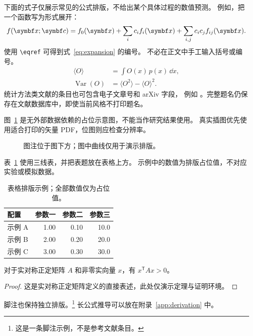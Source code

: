\label{chap:methods}
下面的式子仅展示常见的公式排版，不给出某个具体过程的数值预测。
例如，把一个函数写为形式展开：
\begin{equation}
 f(\vect{x};\vect{c})=f_0(\vect{x})+
 \sum_i c_i f_i(\vect{x})+
 \sum_{i,j}c_i c_j f_{ij}(\vect{x}).
 \label{eq:expansion}
\end{equation}
使用 \verb|\eqref| 可得到式~\eqref{eq:expansion} 的编号。
不必在正文中手工输入括号或编号。
\begin{align}
 \langle O\rangle &= \int O(x)\,p(x)\,\dd x,\\
 \operatorname{Var}(O) &= \langle O^2\rangle-\langle O\rangle^2.
\end{align}
统计方法类文献的条目也可包含电子文章号和 arXiv 字段，
例如 \cite{Cowan2011}。完整题名仍保存在文献数据库中，即使当前风格不打印题名。

图~\ref{fig:placeholder} 是无外部数据依赖的占位示意图，不能当作研究结果使用。
真实插图优先使用适合打印的矢量 PDF，位图则应检查分辨率。
\begin{figure}[htbp]
 \centering
 \caption{图注位于图下方；图中曲线仅用于演示排版。}
 \label{fig:placeholder}
\end{figure}

表~\ref{tab:example} 使用三线表，并把表题放在表格上方。
示例中的数值为排版占位值，不对应实验或模拟数据。
\begin{table}[htbp]
 \centering
 \caption{表格排版示例；全部数值仅为占位值。}
 \label{tab:example}
 \begin{tabular}{lrrr}
  \toprule
  配置 & 参数一 & 参数二 & 参数三 \\
  \midrule
  示例 A & 1.00 & 0.10 & 10.0 \\
  示例 B & 2.00 & 0.20 & 20.0 \\
  示例 C & 3.00 & 0.30 & 30.0 \\
  \bottomrule
 \end{tabular}
\end{table}

\begin{theorem}
对于实对称正定矩阵 $A$ 和非零实向量 $x$，有 $x^{\mathsf{T}}Ax>0$。
\end{theorem}
\begin{proof}
这是实对称正定矩阵定义的直接表述，此处仅演示定理与证明环境。
\end{proof}
脚注也保持独立排版。\footnote{这是一条脚注示例，不是参考文献条目。}
长公式推导可以放在附录~\ref{app:derivation} 中。
